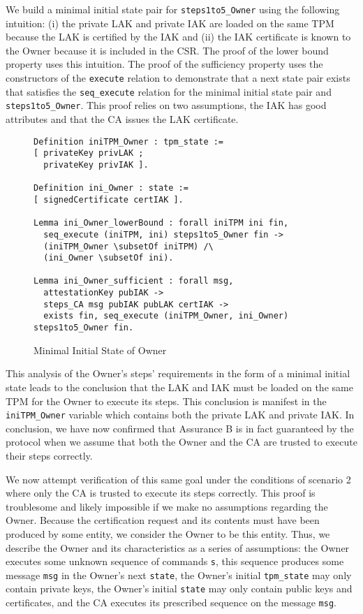 \documentclass[runningheads]{llncs}
\begin{document}
We build a minimal initial state pair for \verb|steps1to5_Owner| using
the following intuition: (i) the private LAK and private IAK are
loaded on the same TPM because the LAK is certified by the IAK and
(ii) the IAK certificate is known to the Owner because it is included
in the CSR.  The proof of the lower bound property uses this
intuition.  The proof of the sufficiency property uses the
constructors of the \verb|execute| relation to demonstrate that a next
state pair exists that satisfies the \verb|seq_execute| relation for
the minimal initial state pair and \verb|steps1to5_Owner|. This proof
relies on two assumptions, the IAK has good attributes and that the CA
issues the LAK certificate.

\begin{figure}[hbtp]
\begin{lstlisting}[language=Coq]
Definition iniTPM_Owner : tpm_state :=
[ privateKey privLAK ;
  privateKey privIAK ].

Definition ini_Owner : state :=
[ signedCertificate certIAK ].

Lemma ini_Owner_lowerBound : forall iniTPM ini fin,
  seq_execute (iniTPM, ini) steps1to5_Owner fin ->
  (iniTPM_Owner \subsetOf iniTPM) /\
  (ini_Owner \subsetOf ini).

Lemma ini_Owner_sufficient : forall msg,
  attestationKey pubIAK ->
  steps_CA msg pubIAK pubLAK certIAK ->
  exists fin, seq_execute (iniTPM_Owner, ini_Owner) steps1to5_Owner fin.
\end{lstlisting}
\caption{Minimal Initial State of Owner}
\end{figure}

This analysis of the Owner's steps' requirements in the form of a
minimal initial state leads to the conclusion that the LAK and IAK
must be loaded on the same TPM for the Owner to execute its
steps. This conclusion is manifest in the \verb|iniTPM_Owner| variable
which contains both the private LAK and private IAK. In conclusion, we
have now confirmed that Assurance B is in fact guaranteed by the
protocol when we assume that both the Owner and the CA are trusted to
execute their steps correctly.

We now attempt verification of this same goal under the conditions of
scenario 2 where only the CA is trusted to execute its steps
correctly. This proof is troublesome and likely impossible if we make
no assumptions regarding the Owner.  Because the certification request
and its contents must have been produced by some entity, we consider
the Owner to be this entity.  Thus, we describe the Owner and its
characteristics as a series of assumptions: the Owner executes some
unknown sequence of commands \verb|s|, this sequence produces some
message \verb|msg| in the Owner's next \verb|state|, the Owner's
initial \verb|tpm_state| may only contain private keys, the Owner's
initial \verb|state| may only contain public keys and certificates,
and the CA executes its prescribed sequence on the message \verb|msg|.
\end{document}
